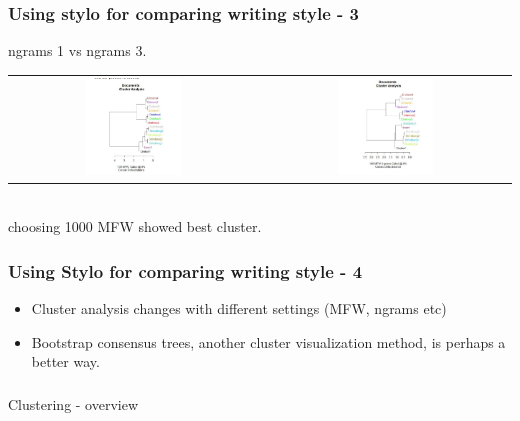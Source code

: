 \documentclass{beamer}
\begin{document}
\begin{frame}
\frametitle{Using stylo for comparing writing style - 3}
ngrams 1 vs ngrams 3. 
\begin{tabular}{cc}
\includegraphics[width=0.4\textwidth]{cockrill-1.png} & \includegraphics[width=0.4\textwidth]{cockrill-2.png}\\
\end{tabular}
\\ choosing 1000 MFW showed best cluster.
\end{frame}

\begin{frame}
\frametitle{Using Stylo for comparing writing style - 4}
\begin{itemize}
\item Cluster analysis changes with different settings (MFW, ngrams etc)
\item Bootstrap consensus trees, another cluster visualization method, is perhaps a better way. 
\end{itemize}
\end{frame}

\begin{frame}
\frametitle{}
\Large Clustering - overview
\end{frame}
\end{document}
